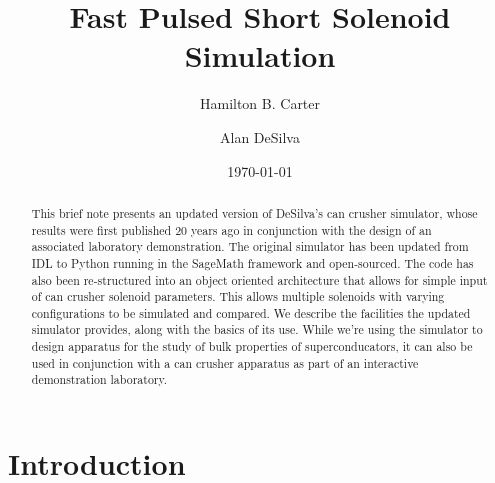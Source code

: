 \documentclass[prb,preprint]{revtex4-1}
\begin{document}

\title{Fast Pulsed Short Solenoid Simulation
}

\author{Hamilton B. Carter}

\author{Alan DeSilva}


\date{\today}

\begin{abstract}
This brief note  presents an updated version of DeSilva's can crusher simulator, whose results were first published 20 years ago in conjunction with the design of an associated laboratory demonstration.  The original simulator has been updated from IDL to Python running in the SageMath framework and open-sourced.  The code has also been re-structured into an object oriented architecture that allows for simple input of can crusher solenoid parameters.  This allows multiple solenoids with varying configurations to be simulated and compared.  We describe the facilities the updated simulator provides, along with the basics of its use.  While we're using the simulator to design apparatus for the study of bulk properties of superconducators, it can also be used in conjunction with a can crusher apparatus as part of an interactive demonstration laboratory.
\end{abstract}

\maketitle %


\section{Introduction} %
\end{document}
